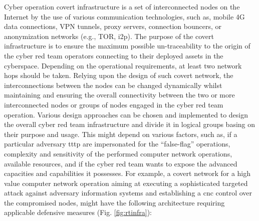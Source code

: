 Cyber operation covert infrastructure is a set of interconnected nodes on the Internet by the use of various communication technologies, such as, mobile 4G data connections, VPN tunnels, proxy servers, connection bouncers, or anonymization networks (e.g., TOR, i2p). The purpose of the covert infrastructure is to ensure the maximum possible un-traceability to the origin of the cyber red team operators connecting to their deployed assets in the cyberspace. Depending on the operational requirements, at least two network hops should be taken. Relying upon the design of such covert network, the interconnections between the nodes can be changed dynamically whilst maintaining and ensuring the overall connectivity between the two or more interconnected nodes or groups of nodes engaged in the cyber red team operation.
Various design approaches can be chosen and implemented to design the overall cyber red team infrastructure and divide it in logical groups basing on their purpose and usage. This might depend on various factors, such as, if a particular adversary \gls{tttp} are impersonated for the ``false-flag'' operations, complexity and sensitivity of the performed computer network operations, available resources, and if the cyber red team wants to expose the advanced capacities and capabilities it possesses. For example, a covert network for a high value computer network operation aiming at executing a sophisticated targeted attack against adversary information systems and establishing a \gls{cnc} control over the compromised nodes, might have the following architecture requiring applicable defensive measures (Fig. \ref{fig:rtinfra}):
